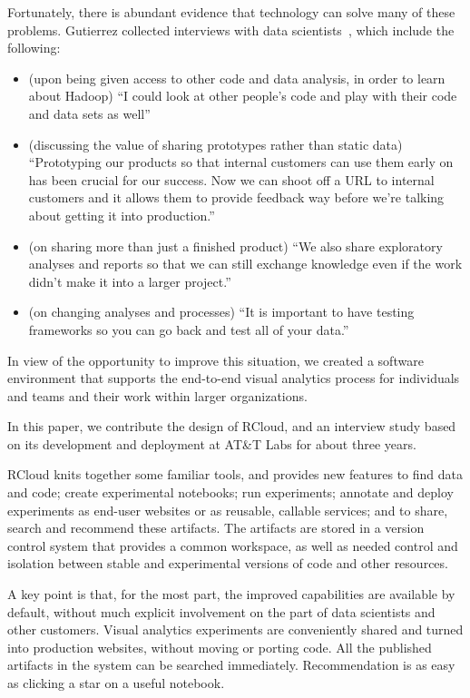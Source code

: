 Fortunately, there is abundant evidence that technology can
solve many of these problems.
Gutierrez collected interviews with data scientists~\cite{Gutierrez:2014:DSA},
which include the following:

\begin{itemize}
\item (upon being given access to other code and data analysis, in
order to learn about Hadoop) ``I could look at other people’s code
and play with their code and data sets as well''
\item (discussing the value of sharing prototypes rather than static
data) ``Prototyping our products so that internal
customers can use them early on has been crucial for
our success. Now we can shoot off a URL to internal
customers and it allows them to provide feedback way before
we're talking about getting it into production.''
\item (on sharing more than just a finished product) ``We also share
exploratory analyses and reports so that we can still exchange
knowledge even if the work didn't make it into a larger project.''
\item (on changing analyses and processes) ``It is important to
have testing frameworks so you can go back and test all
of your data.''
\end{itemize}

In view of the opportunity to improve this situation,
we created a software environment that supports the end-to-end
visual analytics process for individuals and teams and
their work within larger organizations.

In this paper, we contribute the design of RCloud, and an
interview study based on its development and deployment
at AT\&T Labs for about three years.

RCloud knits together some familiar tools, and 
provides new features to find data and code; create experimental notebooks;
run experiments; annotate and deploy experiments as end-user websites or
as reusable, callable services; and to share, search and recommend these artifacts. The artifacts are stored in a version
control system that provides a common workspace, as well as needed control
and isolation between stable and experimental versions of code and other
resources. 

A key point is that, for the most part, the improved capabilities are
available by default, without much explicit involvement on the part of
data scientists and other customers. Visual analytics experiments are
conveniently shared and turned into production websites, without moving
or porting code. All the published artifacts in the system can be
searched immediately. Recommendation is as easy as clicking a star
on a useful notebook.

